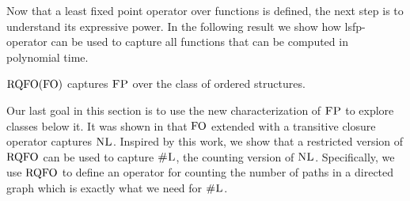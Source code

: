 Now that a least fixed point operator over functions is defined, the next step is to understand its expressive power.
In the following result we show how lsfp-operator can be used to capture all functions that can be computed in polynomial time.
\begin{theorem} \label{rqfo-fo-cap}
	${\rm RQFO}({\rm FO})$ captures $\text{\sc FP}$ over the class of ordered structures.
\end{theorem}

%
%
%

Our last goal in this section is to use the new characterization of $\text{\sc FP}$ to explore classes below it.
It was shown in \cite{I86,I88} that ${\rm FO}$ extended with a transitive closure operator captures $\text{\sc NL}$. 
Inspired by this work, we show that a restricted version of ${\rm RQFO}$ can be used to capture $\text{\sc \#L}$, the counting version of $\text{\sc NL}$. 
Specifically, we use ${\rm RQFO}$ to define an operator for counting the number of paths in a directed graph which is exactly what we need for $\text{\sc \#L}$. 

